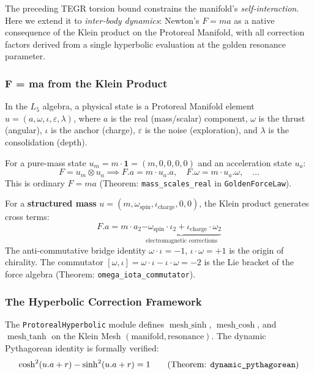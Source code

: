 The preceding TEGR torsion bound constrains the manifold's \emph{self-interaction}. Here we extend it to \emph{inter-body dynamics}: Newton's $F = ma$ as a native consequence of the Klein product on the Protoreal Manifold, with all correction factors derived from a single hyperbolic evaluation at the golden resonance parameter.

\subsubsection{F = ma from the Klein Product}

In the $L_5$ algebra, a physical state is a Protoreal Manifold element $u = (a, \omega, \iota, \varepsilon, \lambda)$, where $a$ is the real (mass/scalar) component, $\omega$ is the thrust (angular), $\iota$ is the anchor (charge), $\varepsilon$ is the noise (exploration), and $\lambda$ is the consolidation (depth).

For a pure-mass state $u_m = m \cdot \mathbf{1} = (m, 0, 0, 0, 0)$ and an acceleration state $u_a$:
\begin{equation}
    F = u_m \otimes u_a \implies F.a = m \cdot u_a.a, \quad F.\omega = m \cdot u_a.\omega, \quad \ldots
\end{equation}
This is ordinary $F = ma$ (Theorem: \texttt{mass\_scales\_real} in \texttt{GoldenForceLaw}).

For a \textbf{structured mass} $u = (m, \omega_{\text{spin}}, \iota_{\text{charge}}, 0, 0)$, the Klein product generates cross terms:
\begin{equation}
    F.a = m \cdot a_2 \underbrace{- \omega_{\text{spin}} \cdot \iota_2 + \iota_{\text{charge}} \cdot \omega_2}_{\text{electromagnetic corrections}}
\end{equation}
The anti-commutative bridge identity $\omega \cdot \iota = -1$, $\iota \cdot \omega = +1$ is the origin of chirality. The commutator $[\omega, \iota] = \omega \cdot \iota - \iota \cdot \omega = -2$ is the Lie bracket of the force algebra (Theorem: \texttt{omega\_iota\_commutator}).

\subsubsection{The Hyperbolic Correction Framework}

The \texttt{ProtorealHyperbolic} module defines $\operatorname{mesh\_sinh}$, $\operatorname{mesh\_cosh}$, and $\operatorname{mesh\_tanh}$ on the Klein Mesh $(\text{manifold}, \text{resonance})$. The dynamic Pythagorean identity is formally verified:
\begin{equation}
    \cosh^2(u.a + r) - \sinh^2(u.a + r) = 1 \qquad \text{(Theorem: \texttt{dynamic\_pythagorean})}
\end{equation}

